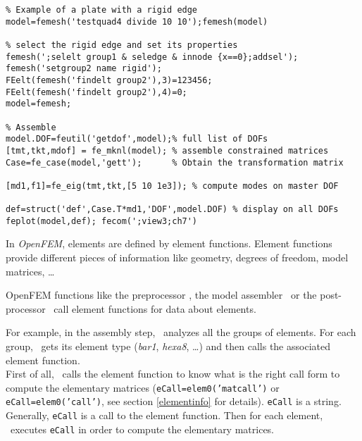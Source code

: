 \begin{verbatim}
% Example of a plate with a rigid edge
model=femesh('testquad4 divide 10 10');femesh(model)

% select the rigid edge and set its properties
femesh(';selelt group1 & seledge & innode {x==0};addsel');
femesh('setgroup2 name rigid');
FEelt(femesh('findelt group2'),3)=123456;
FEelt(femesh('findelt group2'),4)=0;
model=femesh;

% Assemble
model.DOF=feutil('getdof',model);% full list of DOFs
[tmt,tkt,mdof] = fe_mknl(model); % assemble constrained matrices
Case=fe_case(model,'gett');      % Obtain the transformation matrix

[md1,f1]=fe_eig(tmt,tkt,[5 10 1e3]); % compute modes on master DOF

def=struct('def',Case.T*md1,'DOF',model.DOF) % display on all DOFs
feplot(model,def); fecom(';view3;ch7')
\end{verbatim}






\begin{center}
\end{center}

In {\sl OpenFEM}, elements are defined by element functions. Element functions provide different pieces of information like geometry, degrees of freedom, model matrices, \ldots

OpenFEM functions like the preprocessor \femesh, the model assembler \femk\ or the post-processor \feplot\ call element functions for data about elements.

For example, in the assembly step, \femk\ analyzes all the groups of elements. For each group, \femk\ gets its element type ({\sl bar1}, {\sl hexa8}, \ldots) and then calls the associated element function.\\
First of all, \femk\ calls the element function to know what is the right call form to compute the elementary matrices ({\tt eCall=elem0('matcall')} or {\tt eCall=elem0('call')}, see section \ref{elementinfo} for details). {\tt eCall} is a string. Generally, {\tt eCall} is a call to the element function. Then for each element, \femk\ executes {\tt eCall} in order to compute the elementary matrices. 


